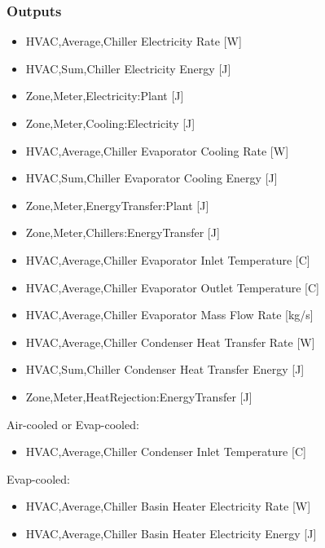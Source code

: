 \subsubsection{Outputs}\label{outputs-2-015}

\begin{itemize}
    \item
    HVAC,Average,Chiller Electricity Rate {[}W{]}
    \item
    HVAC,Sum,Chiller Electricity Energy {[}J{]}
    \item
    Zone,Meter,Electricity:Plant {[}J{]}
    \item
    Zone,Meter,Cooling:Electricity {[}J{]}
    \item
    HVAC,Average,Chiller Evaporator Cooling Rate {[}W{]}
    \item
    HVAC,Sum,Chiller Evaporator Cooling Energy {[}J{]}
    \item
    Zone,Meter,EnergyTransfer:Plant {[}J{]}
    \item
    Zone,Meter,Chillers:EnergyTransfer {[}J{]}
    \item
    HVAC,Average,Chiller Evaporator Inlet Temperature {[}C{]}
    \item
    HVAC,Average,Chiller Evaporator Outlet Temperature {[}C{]}
    \item
    HVAC,Average,Chiller Evaporator Mass Flow Rate {[}kg/s{]}
    \item
    HVAC,Average,Chiller Condenser Heat Transfer Rate {[}W{]}
    \item
    HVAC,Sum,Chiller Condenser Heat Transfer Energy {[}J{]}
    \item
    Zone,Meter,HeatRejection:EnergyTransfer {[}J{]}
\end{itemize}

Air-cooled or Evap-cooled:

\begin{itemize}
    \tightlist
    \item
    HVAC,Average,Chiller Condenser Inlet Temperature {[}C{]}
\end{itemize}

Evap-cooled:

\begin{itemize}
    \item
    HVAC,Average,Chiller Basin Heater Electricity Rate {[}W{]}
    \item
    HVAC,Average,Chiller Basin Heater Electricity Energy {[}J{]}
\end{itemize}

